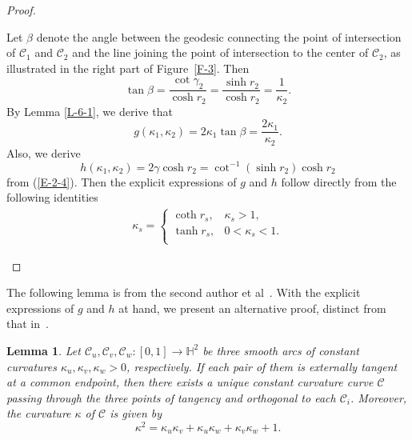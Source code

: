 \documentclass[11pt,leqno]{article}
\numberwithin{equation}{section}
\newtheorem{lemma}[theorem]{Lemma}
\theoremstyle{definition}
\begin{document}
\begin{proof}
\begin{itemize}
    Let $\beta$ denote the angle between the geodesic connecting the point of intersection of  $\mathcal C_1$ and $\mathcal C_2$ and the line joining the point of intersection to the center of  $\mathcal C_2$, as illustrated in the right part of Figure~\ref{F-3}. Then
\[\tan\beta=\frac{\cot\gamma_2}{\cosh r_2}=\frac{\sinh r_2}{\cosh r_2}=\frac{1}{\kappa_2}.\]
By Lemma \ref{L-6-1}, we derive that
    \[g(\kappa_1,\kappa_2)=2 \kappa_1\tan\beta=\frac{2\kappa_1}{\kappa_2}.\]
    Also, we derive
    \[h(\kappa_1,\kappa_2)=2\gamma\cosh r_2=\cot^{-1}(\sinh r_2)\cosh r_2\]
from (\ref{E-2-4}). Then the explicit expressions of $g$ and $h$ follow directly from the following identities
\[\begin{aligned}
\kappa_s=\begin{cases}
\coth r_s, & \kappa_s>1,\\
\tanh r_s, & 0<\kappa_s<1.\\
\end{cases}
\end{aligned}\]
\end{itemize}

\end{proof}

The following lemma is from the second author et al~\cite{MR4878836}. With the explicit expressions of $g$ and $h$ at hand, we present an alternative proof, distinct from that in~\cite{MR4878836}.

\begin{lemma}\label{L-3-4}
Let $\mathcal{C}_u, \mathcal{C}_v, \mathcal{C}_w: [0,1] \to \mathbb{H}^2$ be three smooth arcs of constant curvatures $\kappa_u, \kappa_v, \kappa_w>0$, respectively. If each pair of them is externally tangent at a common endpoint, then there exists a unique constant curvature curve $\mathcal C$ passing through the three points of tangency and orthogonal to each $\mathcal C_i$. Moreover, the curvature $\kappa$ of $\mathcal C$ is given by
\begin{equation}\label{E-2-7}\kappa^2=\kappa_u\kappa_v+\kappa_u\kappa_w+\kappa_v\kappa_w+1.\end{equation}
\end{lemma}
\end{document}
